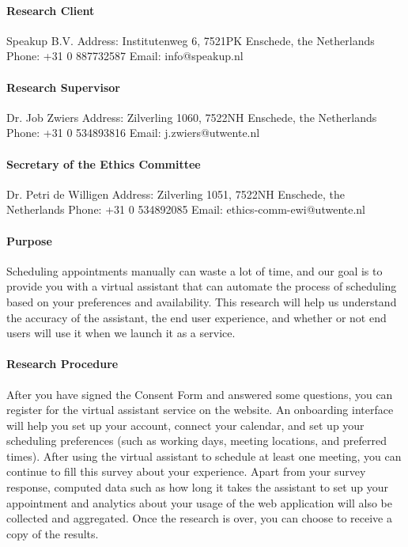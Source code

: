 \documentclass{article}
\begin{document}
\paragraph{Research Client}
Speakup B.V.\newline
Address: Institutenweg 6, 7521PK Enschede, the Netherlands\newline
Phone: +31 0 887732587\newline
Email: info@speakup.nl

\paragraph{Research Supervisor}
Dr. Job Zwiers\newline
Address: Zilverling 1060, 7522NH Enschede, the Netherlands\newline
Phone: +31 0 534893816\newline
Email: j.zwiers@utwente.nl

\paragraph{Secretary of the Ethics Committee}
Dr. Petri de Willigen\newline
Address: Zilverling 1051, 7522NH Enschede, the Netherlands\newline
Phone: +31 0 534892085\newline
Email: ethics-comm-ewi@utwente.nl

\paragraph{Purpose}

Scheduling appointments manually can waste a lot of time, and our goal is to provide you with a virtual assistant that can automate the process of scheduling based on your preferences and availability. This research will help us understand the accuracy of the assistant, the end user experience, and whether or not end users will use it when we launch it as a service.

\paragraph{Research Procedure}

After you have signed the Consent Form and answered some questions, you can register for the virtual assistant service on the website. An onboarding interface will help you set up your account, connect your calendar, and set up your scheduling preferences (such as working days, meeting locations, and preferred times). After using the virtual assistant to schedule at least one meeting, you can continue to fill this survey about your experience. Apart from your survey response, computed data such as how long it takes the assistant to set up your appointment and analytics about your usage of the web application will also be collected and aggregated. Once the research is over, you can choose to receive a copy of the results.
\end{document}
